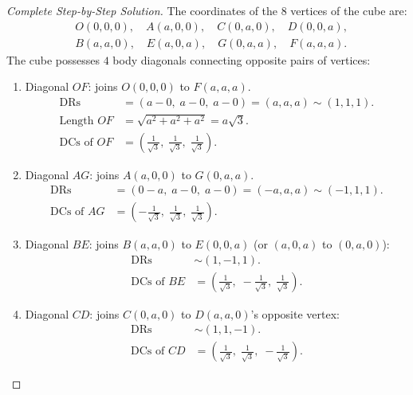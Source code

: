 \begin{proof}[Complete Step-by-Step Solution]
The coordinates of the $8$ vertices of the cube are:
\begin{align}
    &O(0,0,0), \quad A(a,0,0), \quad C(0,a,0), \quad D(0,0,a), \nonumber\\
    &B(a,a,0), \quad E(a,0,a), \quad G(0,a,a), \quad F(a,a,a).
\end{align}
The cube possesses $4$ body diagonals connecting opposite pairs of vertices:
\begin{enumerate}
    \item Diagonal $OF$: joins $O(0,0,0)$ to $F(a,a,a)$.
    \begin{align}
        \text{DRs} &= (a - 0, \; a - 0, \; a - 0) = (a, a, a) \sim (1, 1, 1). \nonumber\\
        \text{Length } OF &= \sqrt{a^2 + a^2 + a^2} = a\sqrt{3}. \nonumber\\
        \text{DCs of } OF &= \left(\frac{1}{\sqrt{3}}, \; \frac{1}{\sqrt{3}}, \; \frac{1}{\sqrt{3}}\right).
    \end{align}
    \item Diagonal $AG$: joins $A(a,0,0)$ to $G(0,a,a)$.
    \begin{align}
        \text{DRs} &= (0 - a, \; a - 0, \; a - 0) = (-a, a, a) \sim (-1, 1, 1). \nonumber\\
        \text{DCs of } AG &= \left(-\frac{1}{\sqrt{3}}, \; \frac{1}{\sqrt{3}}, \; \frac{1}{\sqrt{3}}\right).
    \end{align}
    \item Diagonal $BE$: joins $B(a,a,0)$ to $E(0,0,a)$ (or $(a,0,a)$ to $(0,a,0)$):
    \begin{align}
        \text{DRs} &\sim (1, -1, 1). \nonumber\\
        \text{DCs of } BE &= \left(\frac{1}{\sqrt{3}}, \; -\frac{1}{\sqrt{3}}, \; \frac{1}{\sqrt{3}}\right).
    \end{align}
    \item Diagonal $CD$: joins $C(0,a,0)$ to $D(a,a,0)$'s opposite vertex:
    \begin{align}
        \text{DRs} &\sim (1, 1, -1). \nonumber\\
        \text{DCs of } CD &= \left(\frac{1}{\sqrt{3}}, \; \frac{1}{\sqrt{3}}, \; -\frac{1}{\sqrt{3}}\right).
    \end{align}
\end{enumerate}


\end{proof}
